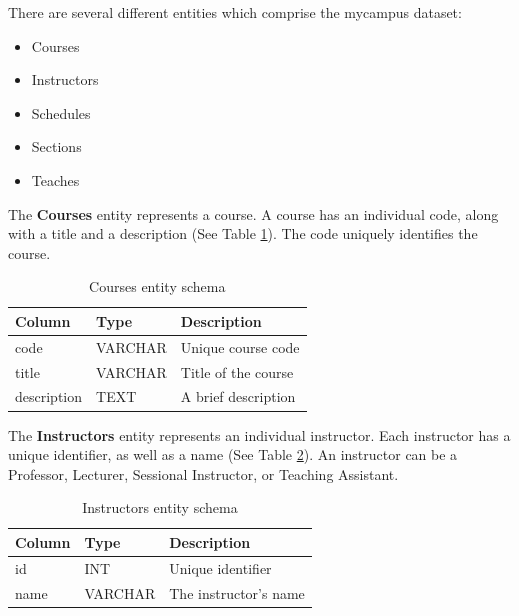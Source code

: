 \documentclass[12pt,letterpaper,oneside,notitlepage]{report}
\theoremstyle{definition}
\begin{document}
      There are several different entities which comprise the mycampus dataset:
      
      \begin{itemize}
        \item Courses
        \item Instructors
        \item Schedules
        \item Sections
        \item Teaches
      \end{itemize}
      
      The \textbf{Courses} entity represents a course.  A course has an individual code, along with a title and a description (See Table  \ref{tbl:courses-entity-schema}).  The code uniquely identifies the course.
      
      \begin{table}[!htp]
        \centering
        \begin{tabular}{lll}
          \toprule
          Column & Type & Description \\
          \midrule
          code & VARCHAR & Unique course code \\
          title & VARCHAR & Title of the course \\
          description & TEXT & A brief description \\
          \bottomrule
        \end{tabular}
        \caption{Courses entity schema}
        \label{tbl:courses-entity-schema}
      \end{table}
      
      The \textbf{Instructors} entity represents an individual instructor.  Each instructor has a unique identifier, as well as a name (See Table \ref{tbl:instructors-entity-schema}).  An instructor can be a Professor, Lecturer, Sessional Instructor, or Teaching Assistant.
      
      \begin{table}[!htp]
        \centering
        \begin{tabular}{lll}
          \toprule
          Column & Type & Description \\
          \midrule
          id & INT & Unique identifier \\
          name & VARCHAR & The instructor's name \\
          \bottomrule
        \end{tabular}
        \caption{Instructors entity schema}
        \label{tbl:instructors-entity-schema}
      \end{table}
      
\end{document}
